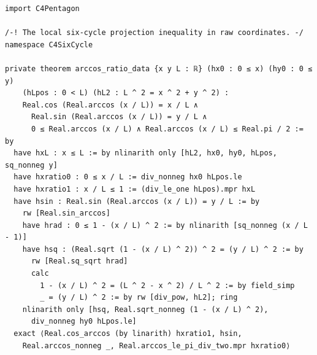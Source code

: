 \documentclass[11pt,a4paper]{article}
\begin{document}
\begin{Verbatim}[breaklines,breakanywhere,fontsize=\footnotesize]
import C4Pentagon

/-! The local six-cycle projection inequality in raw coordinates. -/
namespace C4SixCycle

private theorem arccos_ratio_data {x y L : ℝ} (hx0 : 0 ≤ x) (hy0 : 0 ≤ y)
    (hLpos : 0 < L) (hL2 : L ^ 2 = x ^ 2 + y ^ 2) :
    Real.cos (Real.arccos (x / L)) = x / L ∧
      Real.sin (Real.arccos (x / L)) = y / L ∧
      0 ≤ Real.arccos (x / L) ∧ Real.arccos (x / L) ≤ Real.pi / 2 := by
  have hxL : x ≤ L := by nlinarith only [hL2, hx0, hy0, hLpos, sq_nonneg y]
  have hxratio0 : 0 ≤ x / L := div_nonneg hx0 hLpos.le
  have hxratio1 : x / L ≤ 1 := (div_le_one hLpos).mpr hxL
  have hsin : Real.sin (Real.arccos (x / L)) = y / L := by
    rw [Real.sin_arccos]
    have hrad : 0 ≤ 1 - (x / L) ^ 2 := by nlinarith [sq_nonneg (x / L - 1)]
    have hsq : (Real.sqrt (1 - (x / L) ^ 2)) ^ 2 = (y / L) ^ 2 := by
      rw [Real.sq_sqrt hrad]
      calc
        1 - (x / L) ^ 2 = (L ^ 2 - x ^ 2) / L ^ 2 := by field_simp
        _ = (y / L) ^ 2 := by rw [div_pow, hL2]; ring
    nlinarith only [hsq, Real.sqrt_nonneg (1 - (x / L) ^ 2),
      div_nonneg hy0 hLpos.le]
  exact ⟨Real.cos_arccos (by linarith) hxratio1, hsin,
    Real.arccos_nonneg _, Real.arccos_le_pi_div_two.mpr hxratio0⟩


\end{Verbatim}
\end{document}
